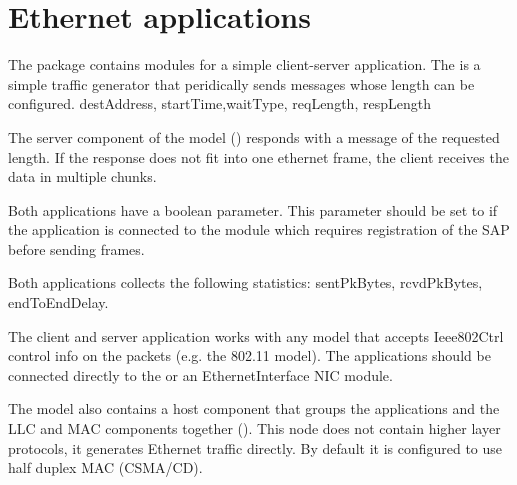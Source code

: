 
\section{Ethernet applications}

The  package contains modules
for a simple client-server application. The  is a simple
traffic generator that peridically sends  messages
whose length can be configured. destAddress, startTime,waitType, reqLength, respLength

The server component of the model () responds with a
 message of the requested length. If the response does
not fit into one ethernet frame, the client receives the data in multiple
chunks.


Both applications have a  boolean parameter.
This parameter should be set to  if the application is connected
to the  module which requires registration of the SAP
before sending frames.

Both applications collects the following statistics: sentPkBytes, rcvdPkBytes,
endToEndDelay.

The client and server application works with any model that accepts
Ieee802Ctrl control info on the packets (e.g. the 802.11 model).
The applications should be connected directly to the 
or an EthernetInterface NIC module.

The model also contains a host component that groups the applications
and the LLC and MAC components together (). This node does
not contain higher layer protocols, it generates Ethernet traffic directly.
By default it is configured to use half duplex MAC (CSMA/CD).



